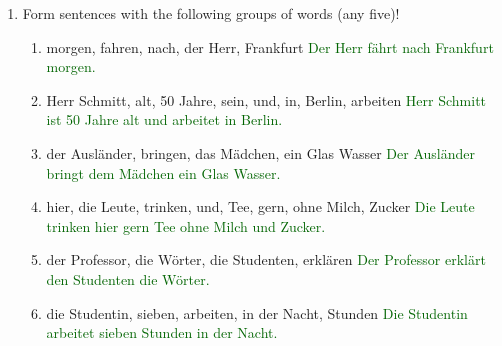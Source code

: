 \documentclass{article}
\begin{document}
\begin{enumerate}
    \item Form sentences with the following groups of words (any five)!
    \begin{enumerate}
        \item morgen, fahren, nach, der Herr, Frankfurt \textcolor{darkgreen}{Der Herr fährt nach Frankfurt morgen.}
        \item Herr Schmitt, alt, 50 Jahre, sein, und, in, Berlin, arbeiten \textcolor{darkgreen}{Herr Schmitt ist 50 Jahre alt und arbeitet in Berlin.}
        \item der Ausländer, bringen, das Mädchen, ein Glas Wasser \textcolor{darkgreen}{Der Ausländer bringt dem Mädchen ein Glas Wasser.}
        \item hier, die Leute, trinken, und, Tee, gern, ohne Milch, Zucker \textcolor{darkgreen}{Die Leute trinken hier gern Tee ohne Milch und Zucker.}
        \item der Professor, die Wörter, die Studenten, erklären \textcolor{darkgreen}{Der Professor erklärt den Studenten die Wörter.}
        \item die Studentin, sieben, arbeiten, in der Nacht, Stunden \textcolor{darkgreen}{Die Studentin arbeitet sieben Stunden in der Nacht.}
    \end{enumerate}
\end{enumerate}
\end{document}
